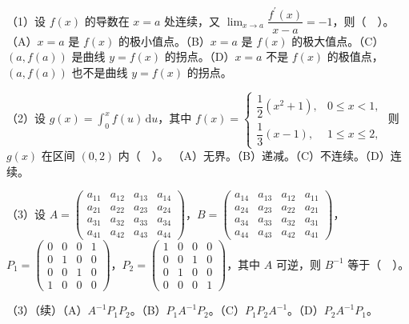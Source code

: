 \documentclass[UTF8,12pt]{ctexart}
\begin{document}
（1）设 \(\displaystyle f(x)\) 的导数在 \(\displaystyle x=a\) 处连续，又 \(\displaystyle \lim_{x\to a}\dfrac{\displaystyle f^{\prime}(x)}{\displaystyle x-a}=-1\)，则（　）。
（A）\(\displaystyle x=a\) 是 \(\displaystyle f(x)\) 的极小值点。（B）\(\displaystyle x=a\) 是 \(\displaystyle f(x)\) 的极大值点。（C）\(\displaystyle (a,\allowbreak f(a))\) 是曲线 \(\displaystyle y=f(x)\) 的拐点。（D）\(\displaystyle x=a\) 不是 \(\displaystyle f(x)\) 的极值点，\(\displaystyle (a,\allowbreak f(a))\) 也不是曲线 \(\displaystyle y=f(x)\) 的拐点。


（2）设 \(\displaystyle g(x)=\displaystyle \int_0^x f(u)\,\mathrm du\)，其中 \(\displaystyle f(x)=\begin{cases}\dfrac{\displaystyle 1}{\displaystyle 2}(x^2+1),\allowbreak &0\le x<1,\allowbreak \\\dfrac{\displaystyle 1}{\displaystyle 3}(x-1),\allowbreak &1\le x\le2,\allowbreak \end{cases}\) 则 \(\displaystyle g(x)\) 在区间 \(\displaystyle (0,\allowbreak 2)\) 内（　）。
（A）无界。（B）递减。（C）不连续。（D）连续。


（3）设 \(\displaystyle A=\begin{pmatrix}a_{11}&a_{12}&a_{13}&a_{14}\\a_{21}&a_{22}&a_{23}&a_{24}\\a_{31}&a_{32}&a_{33}&a_{34}\\a_{41}&a_{42}&a_{43}&a_{44}\end{pmatrix}\)，\(\displaystyle B=\begin{pmatrix}a_{14}&a_{13}&a_{12}&a_{11}\\a_{24}&a_{23}&a_{22}&a_{21}\\a_{34}&a_{33}&a_{32}&a_{31}\\a_{44}&a_{43}&a_{42}&a_{41}\end{pmatrix}\)，\(\displaystyle P_1=\begin{pmatrix}0&0&0&1\\0&1&0&0\\0&0&1&0\\1&0&0&0\end{pmatrix}\)，\(\displaystyle P_2=\begin{pmatrix}1&0&0&0\\0&0&1&0\\0&1&0&0\\0&0&0&1\end{pmatrix}\)，其中 \(\displaystyle A\) 可逆，则 \(\displaystyle B^{-1}\) 等于（　）。


（3）（续）（A）\(\displaystyle A^{-1}P_1P_2\)。（B）\(\displaystyle P_1A^{-1}P_2\)。（C）\(\displaystyle P_1P_2A^{-1}\)。（D）\(\displaystyle P_2A^{-1}P_1\)。
\end{document}
